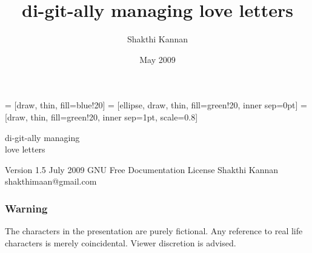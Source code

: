 \documentclass[10pt]{beamer}
\title{di-git-ally managing love letters}
\author{Shakthi Kannan}
\date{May 2009}
\institute{shakthimaan.com}
\newcommand{\medsize}[1]{\fontsize{30}{30}\selectfont #1}
\begin{document}
 = [draw, thin, fill=blue!20]
 = [ellipse, draw, thin, fill=green!20, inner sep=0pt]
 = [draw, thin, fill=green!20, inner sep=1pt, scale=0.8]

%
%

\begin{frame}[fragile]
\begin{block}{}
\begin{center}
\medsize{di-git-ally managing \\love letters}
\end{center}
\end{block}



\begin{semiverbatim}
                               Version 1.5
                                 July 2009
            GNU Free Documentation License
                            Shakthi Kannan
                     shakthimaan@gmail.com
\end{semiverbatim}
\end{frame}

%
%

\begin{frame}[fragile]
\frametitle{Warning}
\begin{center}
\medsize{The characters in the presentation are purely fictional. 
Any reference to real life characters is merely coincidental. 
Viewer discretion is advised.}
\end{center}
\end{frame}

%
%
\end{document}
